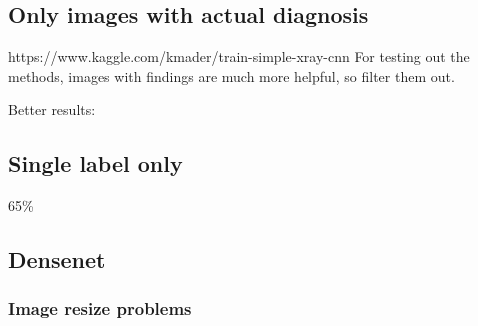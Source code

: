 \subsection{Only images with actual diagnosis}
https://www.kaggle.com/kmader/train-simple-xray-cnn 
For testing out the methods, images with findings are much more helpful, so filter them out.

Better results:


\subsection{Single label only}
65\%

\subsection{Densenet}

\subsubsection{Image resize problems}

